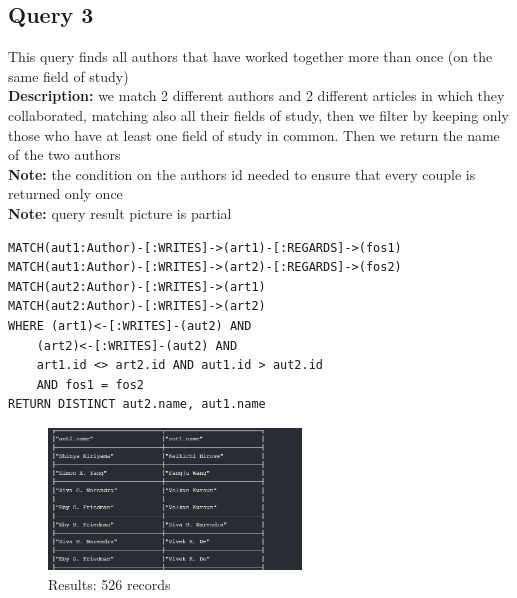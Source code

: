 \documentclass{Configuration_Files/PoliMi3i_thesis}
\begin{document}
\subsection{Query 3}
This query finds all authors that have worked together more than once (on the same field of study)\\
\textbf{Description:} we match 2 different authors and 2 different articles in which they collaborated,
matching also all their fields of study, then we filter by keeping only those who have at least one field of study in common.
Then we return the name of the two authors\\
\textbf{Note:} the condition on the authors id needed to ensure that every couple is returned only once\\
\textbf{Note:} query result picture is partial
\begin{lstlisting}[language=cypher, label=lst:cypher-example]
MATCH(aut1:Author)-[:WRITES]->(art1)-[:REGARDS]->(fos1)
MATCH(aut1:Author)-[:WRITES]->(art2)-[:REGARDS]->(fos2)
MATCH(aut2:Author)-[:WRITES]->(art1)
MATCH(aut2:Author)-[:WRITES]->(art2)
WHERE (art1)<-[:WRITES]-(aut2) AND
    (art2)<-[:WRITES]-(aut2) AND
    art1.id <> art2.id AND aut1.id > aut2.id
    AND fos1 = fos2
RETURN DISTINCT aut2.name, aut1.name
\end{lstlisting}
\begin{figure}[H]
\centering
\includegraphics[width=0.6\textwidth]{query/query3.PNG}
\caption{Results: 526 records}
\label{fig:query3}
\end{figure}
\end{document}

